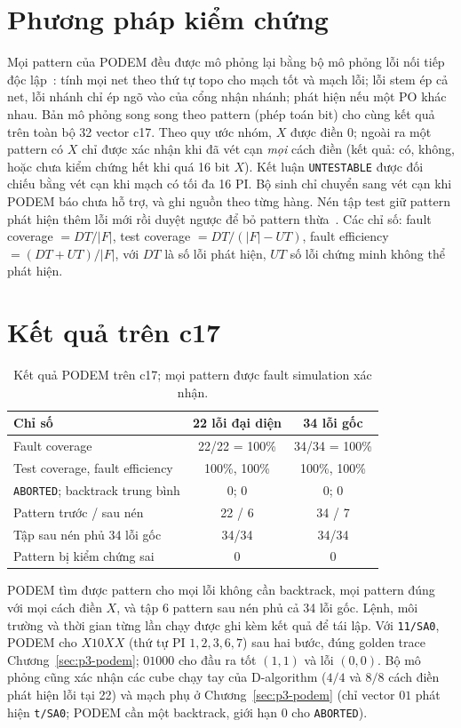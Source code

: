 \section{Phương pháp kiểm chứng}
\label{sec:p6-kiem-chung}
Mọi pattern của PODEM đều được mô phỏng lại bằng bộ mô phỏng lỗi nối tiếp độc
lập~\cite[Ch.~3]{p1_wang2006}: tính mọi net theo thứ tự topo cho mạch tốt và
mạch lỗi; lỗi stem ép cả net, lỗi nhánh chỉ ép ngõ vào của cổng nhận nhánh;
phát hiện nếu một PO khác nhau. Bản mô phỏng song song theo pattern (phép toán
bit) cho cùng kết quả trên toàn bộ 32 vector c17. Theo quy ước nhóm, $X$ được
điền $0$; ngoài ra một pattern có $X$ chỉ được xác nhận khi đã vét cạn
\emph{mọi} cách điền (kết quả: có, không, hoặc chưa kiểm chứng hết khi quá 16
bit $X$). Kết luận \texttt{UNTESTABLE} được đối chiếu
bằng vét cạn khi mạch có tối đa 16 PI. Bộ sinh chỉ chuyển sang vét cạn khi
PODEM báo chưa hỗ trợ, và ghi nguồn theo từng hàng. Nén tập test giữ pattern
phát hiện thêm lỗi mới rồi duyệt ngược để bỏ pattern thừa~\cite[Ch.~4]{p1_wang2006}.
Các chỉ số: fault coverage $=DT/|F|$, test coverage $=DT/(|F|-UT)$, fault
efficiency $=(DT+UT)/|F|$, với $DT$ là số lỗi phát hiện, $UT$ số lỗi chứng minh
không thể phát hiện.

\section{Kết quả trên c17}
\label{sec:p6-c17}
\begin{table}[H]
\centering
\caption{Kết quả PODEM trên c17; mọi pattern được fault simulation xác nhận.}
\label{tab:p6-c17}
\begin{tabular}{@{}lcc@{}}
\toprule
Chỉ số & 22 lỗi đại diện & 34 lỗi gốc\\
\midrule
Fault coverage & 22/22 = 100\% & 34/34 = 100\%\\
Test coverage, fault efficiency & 100\%, 100\% & 100\%, 100\%\\
\texttt{ABORTED}; backtrack trung bình & 0; 0 & 0; 0\\
Pattern trước / sau nén & 22 / 6 & 34 / 7\\
Tập sau nén phủ 34 lỗi gốc & 34/34 & 34/34\\
Pattern bị kiểm chứng sai & 0 & 0\\
\bottomrule
\end{tabular}
\end{table}
PODEM tìm được pattern cho mọi lỗi không cần backtrack, mọi pattern đúng với
mọi cách điền $X$, và tập 6 pattern sau nén phủ cả 34 lỗi gốc. Lệnh, môi
trường và thời gian từng lần chạy được ghi kèm kết quả để tái lập. Với
\texttt{11/SA0}, PODEM cho $X10XX$ (thứ tự PI $1,2,3,6,7$) sau hai bước, đúng
golden trace Chương~\ref{sec:p3-podem}; $01000$ cho đầu ra tốt $(1,1)$ và lỗi
$(0,0)$. Bộ mô phỏng cũng xác nhận các cube chạy tay của D-algorithm ($4/4$
và $8/8$ cách điền phát hiện lỗi tại 22) và mạch phụ ở
Chương~\ref{sec:p3-podem} (chỉ vector $01$ phát hiện
\texttt{t/SA0}; PODEM cần một backtrack, giới hạn 0 cho \texttt{ABORTED}).

